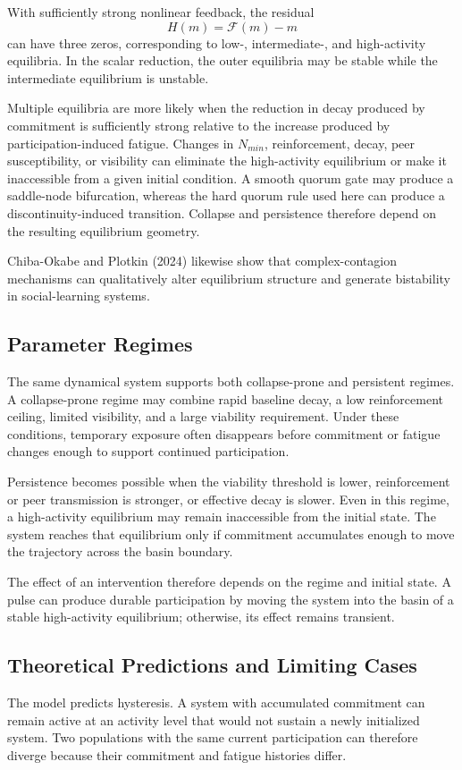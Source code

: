 \documentclass[11pt]{article}
\begin{document}
With sufficiently strong nonlinear feedback, the residual
\[
H(m)=\mathcal{F}(m)-m
\]
can have three zeros, corresponding to low-, intermediate-, and high-activity equilibria. In the scalar reduction, the outer equilibria may be stable while the intermediate equilibrium is unstable.

Multiple equilibria are more likely when the reduction in decay produced by commitment is sufficiently strong relative to the increase produced by participation-induced fatigue. Changes in $N_{min}$, reinforcement, decay, peer susceptibility, or visibility can eliminate the high-activity equilibrium or make it inaccessible from a given initial condition. A smooth quorum gate may produce a saddle-node bifurcation, whereas the hard quorum rule used here can produce a discontinuity-induced transition. Collapse and persistence therefore depend on the resulting equilibrium geometry. 

Chiba-Okabe and Plotkin (2024) likewise show that complex-contagion mechanisms can qualitatively alter equilibrium structure and generate bistability in social-learning systems.

\subsection{Parameter Regimes}
The same dynamical system supports both collapse-prone and persistent regimes. A collapse-prone regime may combine rapid baseline decay, a low reinforcement ceiling, limited visibility, and a large viability requirement. Under these conditions, temporary exposure often disappears before commitment or fatigue changes enough to support continued participation.

Persistence becomes possible when the viability threshold is lower, reinforcement or peer transmission is stronger, or effective decay is slower. Even in this regime, a high-activity equilibrium may remain inaccessible from the initial state. The system reaches that equilibrium only if commitment accumulates enough to move the trajectory across the basin boundary.

The effect of an intervention therefore depends on the regime and initial state. A pulse can produce durable participation by moving the system into the basin of a stable high-activity equilibrium; otherwise, its effect remains transient.

\subsection{Theoretical Predictions and Limiting Cases}
The model predicts hysteresis. A system with accumulated commitment can remain active at an activity level that would not sustain a newly initialized system. Two populations with the same current participation can therefore diverge because their commitment and fatigue histories differ. 
\end{document}
